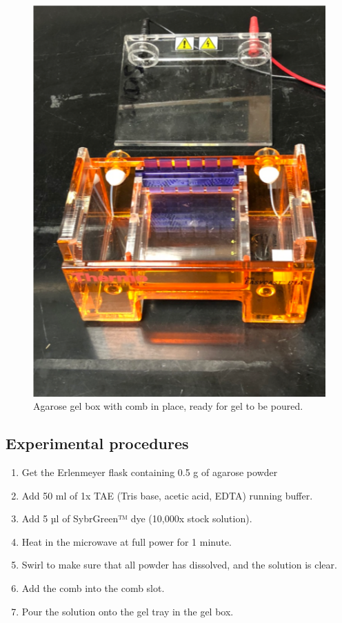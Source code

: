 \begin{figure}

{\centering \includegraphics[width=0.7\linewidth]{./figures/molbio/Gel_box} 

}

\caption{Agarose gel box with comb in place, ready for gel to be poured.}\label{fig:box}
\end{figure}

\subsection{Experimental procedures}\label{experimental-procedures-32}

\begin{enumerate}
\def\labelenumi{\arabic{enumi}.}
\setcounter{enumi}{1}
\tightlist
\item
  Get the Erlenmeyer flask containing 0.5 g of agarose powder
\item
  Add 50 ml of 1x TAE (Tris base, acetic acid, EDTA) running buffer.
\item
  Add 5 µl of SybrGreen™ dye (10,000x stock solution).
\item
  Heat in the microwave at full power for 1 minute.
\item
  Swirl to make sure that all powder has dissolved, and the solution is clear.
\item
  Add the comb into the comb slot.
\item
  Pour the solution onto the gel tray in the gel box.
\end{enumerate}

